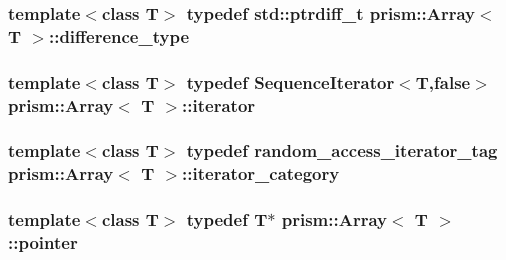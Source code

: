 \subsubsection[{\texorpdfstring{difference\+\_\+type}{difference_type}}]{\setlength{\rightskip}{0pt plus 5cm}template$<$class T$>$ typedef std\+::ptrdiff\+\_\+t {\bf prism\+::\+Array}$<$ T $>$\+::{\bf difference\+\_\+type}}\hypertarget{classprism_1_1_array_abae2669a2cdeba360b37d2f872af9208}{}\label{classprism_1_1_array_abae2669a2cdeba360b37d2f872af9208}
\subsubsection[{\texorpdfstring{iterator}{iterator}}]{\setlength{\rightskip}{0pt plus 5cm}template$<$class T$>$ typedef {\bf Sequence\+Iterator}$<$T,false$>$ {\bf prism\+::\+Array}$<$ T $>$\+::{\bf iterator}}\hypertarget{classprism_1_1_array_acf99b1f921727cf61cf9d5b66acc66b8}{}\label{classprism_1_1_array_acf99b1f921727cf61cf9d5b66acc66b8}
\subsubsection[{\texorpdfstring{iterator\+\_\+category}{iterator_category}}]{\setlength{\rightskip}{0pt plus 5cm}template$<$class T$>$ typedef {\bf random\+\_\+access\+\_\+iterator\+\_\+tag} {\bf prism\+::\+Array}$<$ T $>$\+::{\bf iterator\+\_\+category}}\hypertarget{classprism_1_1_array_a68b5c70152e822463f8d2a3c0c5bebcb}{}\label{classprism_1_1_array_a68b5c70152e822463f8d2a3c0c5bebcb}
\subsubsection[{\texorpdfstring{pointer}{pointer}}]{\setlength{\rightskip}{0pt plus 5cm}template$<$class T$>$ typedef T$\ast$ {\bf prism\+::\+Array}$<$ T $>$\+::{\bf pointer}}\hypertarget{classprism_1_1_array_a391b8bb39ab945786ca33a0110fc163c}{}\label{classprism_1_1_array_a391b8bb39ab945786ca33a0110fc163c}

